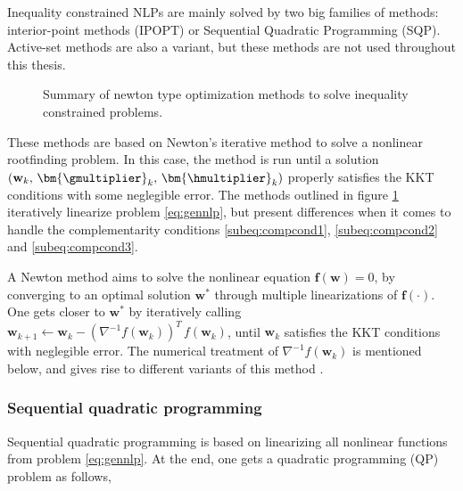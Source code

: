 Inequality constrained NLPs are mainly solved by two big families of methods: interior-point methods (IPOPT) or Sequential Quadratic Programming (SQP). Active-set methods are also a variant, but these methods are not used throughout this thesis.

\begin{figure}[h]
\centering
{}
\caption{Summary of newton type optimization methods to solve inequality constrained problems.}
\label{fig:methodssolveineqcon}
\end{figure}

These methods are based on Newton's iterative method to solve a nonlinear rootfinding problem. In this case, the method is run until a solution $\left(\mathbf{w}_k,\,\bm{\gmultiplier}_k,\,\bm{\hmultiplier}_k\right)$ properly satisfies the KKT conditions with some neglegible error. The methods outlined in figure \ref{fig:methodssolveineqcon} iteratively linearize problem \eqref{eq:gennlp}, but present differences when it comes to handle the complementarity conditions \eqref{subeq:compcond1}, \eqref{subeq:compcond2} and \eqref{subeq:compcond3}.

\begin{remark}
A Newton method aims to solve the nonlinear equation $\mathbf{f}(\mathbf{w})=0$, by converging to an optimal solution $\mathbf{w}^*$ through multiple linearizations of $\mathbf{f}(\cdot)$. One gets closer to $\mathbf{w}^*$ by iteratively calling $\mathbf{w}_{k+1} \gets \mathbf{w}_k - \left(\nabla^{-1} f\left(\mathbf{w}_k\right)\right)^T \, f\left(\mathbf{w}_k\right)$, until $\mathbf{w}_k$ satisfies the KKT conditions with neglegible error. The numerical treatment of $\nabla^{-1} f\left(\mathbf{w}_k\right)$ is mentioned below, and gives rise to different variants of this method \cite{diehl2009efficient, diehlnumericalocp}.
\end{remark}

\subsubsection*{Sequential quadratic programming}
\label{subsubsection:sqp}

Sequential quadratic programming is based on linearizing all nonlinear functions from problem \eqref{eq:gennlp}. At the end, one gets a quadratic programming (QP) problem as follows,

